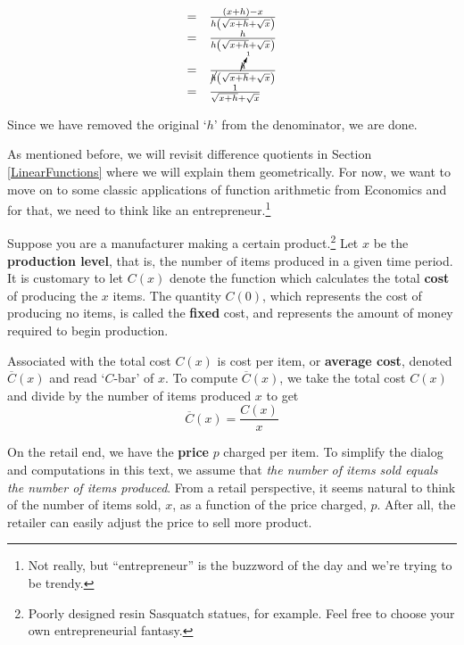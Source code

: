 \documentclass{ximera}
\begin{document}
\begin{example}
\begin{explanation}
\begin{enumerate}
\[\begin{array}{rcll}
												& = &  \frac{(x+h) - x}{h\left(\sqrt{x+h} + \sqrt{x}\right)} & \\  
												
												 & = &  \frac{h}{h\left(\sqrt{x+h} + \sqrt{x}\right)} & \\  
												 
												 												 & = &  \frac{\cancelto{1}{h}}{\cancel{h}\left(\sqrt{x+h} + \sqrt{x}\right)} & \\  
										
										
												 & = &  \frac{1}{\sqrt{x+h} + \sqrt{x}} & \\ 
												\end{array}\]	


Since we have removed the original `$h$' from the denominator, we are done.

\end{enumerate}
\end{explanation}
\end{example}

\label{diffquotgeompromise}

As mentioned before, we will revisit difference quotients in Section \ref{LinearFunctions} where we will explain them geometrically.  For now, we want to move on to some classic applications of function arithmetic from Economics and for that, we need to think like an entrepreneur.\footnote{Not really, but ``entrepreneur'' is the buzzword of the day and we're trying to be trendy.}

Suppose you are a manufacturer making a certain product.\footnote{Poorly designed resin Sasquatch statues, for example.  Feel free to choose your own entrepreneurial fantasy.}  Let $x$ be the \textbf{production level}, that is, the number of items produced in a given time period. It is customary to let $C(x)$ denote the function which calculates the total \textbf{cost} of producing the $x$ items.  The quantity $C(0)$, which represents the cost of producing no items, is called the \textbf{fixed} cost, and represents the amount of money required to begin production. 

Associated with the total cost $C(x)$ is cost per item, or \textbf{average cost}, denoted $\overline{C}(x)$ and read `$C$-bar' of $x$.  To compute $\overline{C}(x)$,  we take the total cost $C(x)$ and divide by the number of items produced $x$ to get \[ \overline{C}(x) = \frac{C(x)}{x}\] 

On the retail end, we have the \textbf{price} $p$ charged per item.  To simplify the dialog and computations in this text, we assume that \textit{the number of items sold equals the number of items produced}. From a retail perspective, it seems natural to think of the number of items sold, $x$, as a function of the price charged, $p$.  After all, the retailer can easily adjust the price to sell more product.  
\end{document}
